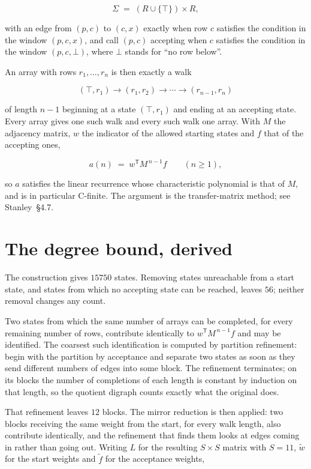 \documentclass[11pt]{article}
\theoremstyle{definition}
\begin{document}
\[\Sigma \;=\; (R \cup \{\top\}) \times R,\]

with an edge from $(p,c)$ to $(c,x)$ exactly when row $c$ satisfies the condition in the window $(p,c,x)$, and call $(p,c)$ accepting when $c$ satisfies the condition in the window $(p,c,\bot)$, where $\bot$ stands for ``no row below''.

An array with rows $r_1,\dots,r_n$ is then exactly a walk

\[(\top,r_1) \to (r_1,r_2) \to \cdots \to (r_{n-1},r_n)\]

of length $n-1$ beginning at a state $(\top,r_1)$ and ending at an accepting state. Every array gives one such walk and every such walk one array. With $M$ the adjacency matrix, $w$ the indicator of the allowed starting states and $f$ that of the accepting ones,

\[a(n) \;=\; w^{\mathsf T} M^{\,n-1} f \qquad (n \ge 1),\]

so $a$ satisfies the linear recurrence whose characteristic polynomial is that of $M$, and is in particular C-finite. The argument is the transfer-matrix method; see Stanley~\S4.7.

\section{The degree bound, derived}

The construction gives $15750$ states. Removing states unreachable from a start state, and states from which no accepting state can be reached, leaves $56$; neither removal changes any count.

Two states from which the same number of arrays can be completed, for every remaining number of rows, contribute identically to $w^{\mathsf T}M^{\,n-1}f$ and may be identified. The coarsest such identification is computed by partition refinement: begin with the partition by acceptance and separate two states as soon as they send different numbers of edges into some block. The refinement terminates; on its blocks the number of completions of each length is constant by induction on that length, so the quotient digraph counts exactly what the original does.

That refinement leaves $12$ blocks. The mirror reduction is then applied: two blocks receiving the same weight from the start, for every walk length, also contribute identically, and the refinement that finds them looks at edges coming in rather than going out. Writing $L$ for the resulting $S \times S$ matrix with $S = 11$, $\tilde w$ for the start weights and $\tilde f$ for the acceptance weights,
\end{document}

